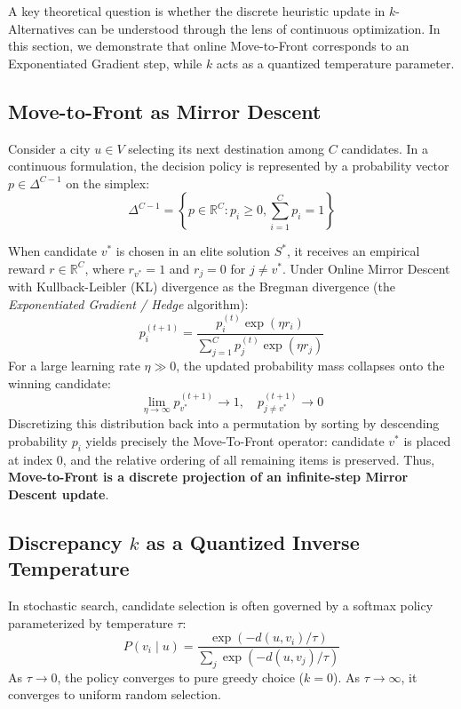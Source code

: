 \documentclass[11pt,a4paper]{article}
\begin{document}
A key theoretical question is whether the discrete heuristic update in $k$-Alternatives can be understood through the lens of continuous optimization. In this section, we demonstrate that online Move-to-Front corresponds to an Exponentiated Gradient step, while $k$ acts as a quantized temperature parameter.

\subsection{Move-to-Front as Mirror Descent}
Consider a city $u \in V$ selecting its next destination among $C$ candidates. In a continuous formulation, the decision policy is represented by a probability vector $p \in \Delta^{C-1}$ on the simplex:
\begin{equation}
    \Delta^{C-1} = \left\{ p \in \mathbb{R}^C : p_i \ge 0, \sum_{i=1}^C p_i = 1 \right\}
\end{equation}

When candidate $v^*$ is chosen in an elite solution $S^*$, it receives an empirical reward $r \in \mathbb{R}^C$, where $r_{v^*} = 1$ and $r_j = 0$ for $j \ne v^*$. Under Online Mirror Descent with Kullback-Leibler (KL) divergence as the Bregman divergence (the \textit{Exponentiated Gradient / Hedge} algorithm):
\begin{equation}
    p^{(t+1)}_i = \frac{p^{(t)}_i \exp(\eta r_i)}{\sum_{j=1}^C p^{(t)}_j \exp(\eta r_j)}
\end{equation}
For a large learning rate $\eta \gg 0$, the updated probability mass collapses onto the winning candidate:
\begin{equation}
    \lim_{\eta \to \infty} p^{(t+1)}_{v^*} \to 1, \quad p^{(t+1)}_{j \ne v^*} \to 0
\end{equation}
Discretizing this distribution back into a permutation by sorting by descending probability $p_i$ yields precisely the Move-To-Front operator: candidate $v^*$ is placed at index 0, and the relative ordering of all remaining items is preserved. Thus, \textbf{Move-to-Front is a discrete projection of an infinite-step Mirror Descent update}.

\subsection{Discrepancy $k$ as a Quantized Inverse Temperature}
In stochastic search, candidate selection is often governed by a softmax policy parameterized by temperature $\tau$:
\begin{equation}
    P(v_i \mid u) = \frac{\exp(-d(u, v_i) / \tau)}{\sum_j \exp(-d(u, v_j) / \tau)}
\end{equation}
As $\tau \to 0$, the policy converges to pure greedy choice ($k = 0$). As $\tau \to \infty$, it converges to uniform random selection. 
\end{document}

